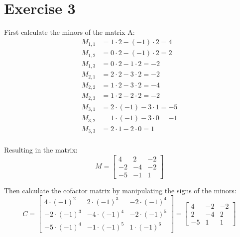 \section{Exercise 3}

First calculate the minors of the matrix A:
\begin{align*}
	M_{1,1} & = 1\cdot 2 - (-1)\cdot 2 = 4  \\
	M_{1,2} & = 0\cdot 2 - (-1)\cdot 2 = 2  \\
	M_{1,3} & = 0\cdot 2 - 1\cdot 2    = -2 \\
	M_{2,1} & = 2\cdot 2 - 3\cdot 2    = -2 \\
	M_{2,2} & = 1\cdot 2 - 3\cdot 2    = -4 \\
	M_{2,3} & = 1\cdot 2 - 2\cdot 2    = -2 \\
	M_{3,1} & = 2\cdot (-1) - 3\cdot 1 = -5 \\
	M_{3,2} & = 1\cdot (-1) - 3\cdot 0 = -1 \\
	M_{3,3} & = 2\cdot 1 - 2\cdot 0    = 1  \\
\end{align*}

Resulting in the matrix:
$$
	M = \begin{bmatrix}
		4  & 2  & -2 \\
		-2 & -4 & -2 \\
		-5 & -1 & 1
	\end{bmatrix}
$$

Then calculate the cofactor matrix by manipulating the signs of the minors:
$$
	C = \begin{bmatrix}
		4  \cdot (-1)^2 & 2  \cdot (-1)^3 & -2 \cdot (-1)^4 \\
		-2 \cdot (-1)^3 & -4 \cdot (-1)^4 & -2 \cdot (-1)^5 \\
		-5 \cdot (-1)^4 & -1 \cdot (-1)^5 & 1  \cdot (-1)^6
	\end{bmatrix} = \begin{bmatrix}
		4  & -2 & -2 \\
		2  & -4 & 2  \\
		-5 & 1  & 1
	\end{bmatrix}
$$

